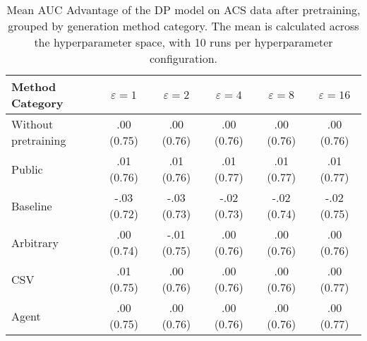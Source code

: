 \begin{table}[h!]
    \centering
    \caption{Mean AUC Advantage of the DP model on ACS data after pretraining, grouped by generation method category. The mean is calculated across the hyperparameter space, with 10 runs per hyperparameter configuration.}
    \label{tab:epsilon_comparison}
    \begin{tabular}{lccccc}
    \toprule
    Method Category & $\varepsilon=1$ & $\varepsilon=2$ & $\varepsilon=4$ & $\varepsilon=8$ & $\varepsilon=16$ \\
    \midrule
    Without pretraining & .00 {\small (0.75)} & .00 {\small (0.76)} & .00 {\small (0.76)} & .00 {\small (0.76)} & .00 {\small (0.76)} \\
    \arrayrulecolor{black!50!}\midrule
    Public & \cellcolor{gold!30}.01 {\small (0.76)} & \cellcolor{gold!30}.01 {\small (0.76)} & \cellcolor{gold!30}.01 {\small (0.77)} & \cellcolor{gold!30}.01 {\small (0.77)} & \cellcolor{gold!30}.01 {\small (0.77)} \\
    \arrayrulecolor{black!50!}\midrule
    Baseline & -.03 {\small (0.72)} & -.03 {\small (0.73)} & -.02 {\small (0.73)} & -.02 {\small (0.74)} & -.02 {\small (0.75)} \\
    \arrayrulecolor{black!50!}\midrule
    Arbitrary & .00 {\small (0.74)} & -.01 {\small (0.75)} & \cellcolor{bronze!30}.00 {\small (0.76)} & .00 {\small (0.76)} & .00 {\small (0.76)} \\
    \arrayrulecolor{black!50!}\midrule
    CSV & \cellcolor{silver!30}.01 {\small (0.75)} & \cellcolor{silver!30}.00 {\small (0.76)} & \cellcolor{silver!30}.00 {\small (0.76)} & \cellcolor{silver!30}.00 {\small (0.76)} & \cellcolor{bronze!30}.00 {\small (0.77)} \\
    Agent & \cellcolor{bronze!30}.00 {\small (0.75)} & \cellcolor{bronze!30}.00 {\small (0.76)} & \cellcolor{silver!30}.00 {\small (0.76)} & \cellcolor{bronze!30}.00 {\small (0.76)} & \cellcolor{silver!30}.00 {\small (0.77)} \\
    \bottomrule
    \end{tabular}
\end{table}